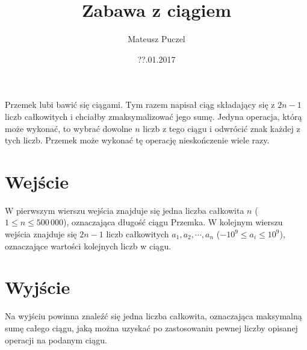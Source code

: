 \documentclass[zad,zawodnik,utf8]{sinol}
\title{Zabawa z ciągiem}
\author{Mateusz Puczel} %
\date{??.01.2017}
\begin{document}
\begin{tasktext}%

Przemek lubi bawić się ciągami. Tym razem napisał ciąg składający się z $2n - 1$ liczb całkowitych i chciałby zmaksymalizować jego sumę.
Jedyna operacja, którą może wykonać, to wybrać dowolne $n$ liczb z tego ciągu i odwrócić znak każdej z tych liczb. Przemek może wykonać tę operację
nieskończenie wiele razy.

  \section{Wejście}
W pierwszym wierszu wejścia znajduje się jedna liczba całkowita $n$ ($1 \leq n \leq 500\,000$), oznaczająca długość ciągu Przemka.
W kolejnym wierszu wejścia znajduje się $2n - 1$ liczb całkowitych $a_1, a_2, \cdots, a_n$ ($-10^9 \leq a_i \leq 10^9$), oznaczające wartości kolejnych liczb w ciągu.

  \section{Wyjście}
Na wyjściu powinna znaleźć się jedna liczba całkowita, oznaczająca maksymalną sumę całego ciągu, jaką można uzyskać po zastosowaniu pewnej liczby opisanej operacji na podanym ciągu.
  
\makecompactexample

\end{tasktext}
\end{document}
